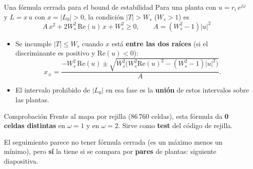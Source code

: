 \documentclass[aspectratio=169,11pt]{beamer}
\begin{document}
\begin{frame}{Una fórmula cerrada para el bound de estabilidad}
  \small
  Para una planta con $u=r_i\,e^{j\varphi}$ y $L=x\,u$ con $x=|L_0|>0$, la condición $|T|>W_s$ ($W_s>1$) es
  \[ A\,x^2+2W_s^2\,\mathrm{Re}(u)\,x+W_s^2\ge0,\qquad A=(W_s^2-1)|u|^2 \]
  \begin{itemize}
    \item Se incumple $|T|\le W_s$ cuando $x$ está \textbf{entre las dos raíces} (si el discriminante es positivo y $\mathrm{Re}(u)<0$):
    \[ x_{\pm}=\frac{-W_s^2\,\mathrm{Re}(u)\pm\sqrt{W_s^2\big(W_s^2\mathrm{Re}(u)^2-(W_s^2-1)|u|^2\big)}}{A}. \]
    \item El intervalo prohibido de $|L_0|$ en esa fase es la \textbf{unión} de estos intervalos sobre las plantas.
  \end{itemize}
  \begin{block}{Comprobación}
    Frente al mapa por rejilla (86\,760 celdas), esta fórmula da \textbf{0 celdas distintas} en $\omega=1$ y en $\omega=2$. Sirve como \textbf{test} del código de rejilla.
  \end{block}
  \footnotesize El seguimiento parece no tener fórmula cerrada (es un máximo menos un mínimo), pero \textbf{sí} la tiene si se compara por \textbf{pares} de plantas: siguiente diapositiva.
\end{frame}
\end{document}
